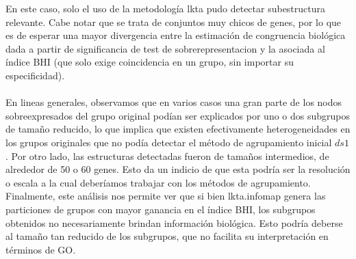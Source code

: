 En este caso, solo el uso de la metodología lkta pudo detectar subestructura relevante. Cabe notar que se trata de conjuntos muy chicos de genes, por lo que es de esperar una mayor divergencia entre la estimación de congruencia biológica dada a partir de significancia de test de sobrerepresentacion y la asociada al índice BHI (que solo exige coincidencia en un grupo, sin importar su especificidad).\\\\
En lineas generales, observamos que en varios casos una gran parte de los nodos sobreexpresados del grupo original podían ser explicados por uno o dos subgrupos de tamaño reducido, lo que implica que existen efectivamente heterogeneidades en los grupos originales que no podía detectar el método de agrupamiento inicial $ds1$. Por otro lado, las estructuras detectadas fueron de tamaños intermedios, de alrededor de 50 o 60 genes. Esto da un indicio de que esta podría ser la resolución o escala a la cual deberíamos trabajar con los métodos de agrupamiento. Finalmente, este análisis nos permite ver que si bien lkta.infomap genera las particiones de grupos con mayor ganancia en el índice BHI, los subgrupos obtenidos no necesariamente brindan información biológica. Esto podría deberse al tamaño tan reducido de los subgrupos, que no facilita su interpretación en términos de GO.




